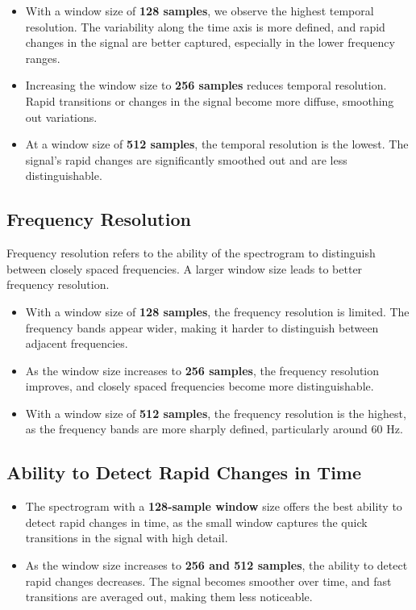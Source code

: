 \documentclass[10pt]{article}
\theoremstyle{definition}
\theoremstyle{remark}
\theoremstyle{definition}
\numberwithin{equation}{prob}
\begin{document}
\begin{itemize}
    \item With a window size of \textbf{128 samples}, we observe the highest temporal resolution. The variability along the time axis is more defined, and rapid changes in the signal are better captured, especially in the lower frequency ranges.
    \item Increasing the window size to \textbf{256 samples} reduces temporal resolution. Rapid transitions or changes in the signal become more diffuse, smoothing out variations.
    \item At a window size of \textbf{512 samples}, the temporal resolution is the lowest. The signal's rapid changes are significantly smoothed out and are less distinguishable.
\end{itemize}

\subsection{Frequency Resolution}
Frequency resolution refers to the ability of the spectrogram to distinguish between closely spaced frequencies. A larger window size leads to better frequency resolution.

\begin{itemize}
    \item With a window size of \textbf{128 samples}, the frequency resolution is limited. The frequency bands appear wider, making it harder to distinguish between adjacent frequencies.
    \item As the window size increases to \textbf{256 samples}, the frequency resolution improves, and closely spaced frequencies become more distinguishable.
    \item With a window size of \textbf{512 samples}, the frequency resolution is the highest, as the frequency bands are more sharply defined, particularly around 60 Hz.
\end{itemize}




\subsection{Ability to Detect Rapid Changes in Time}
\begin{itemize}
    \item The spectrogram with a \textbf{128-sample window} size offers the best ability to detect rapid changes in time, as the small window captures the quick transitions in the signal with high detail.
    \item As the window size increases to \textbf{256 and 512 samples}, the ability to detect rapid changes decreases. The signal becomes smoother over time, and fast transitions are averaged out, making them less noticeable.
\end{itemize}
\end{document}
